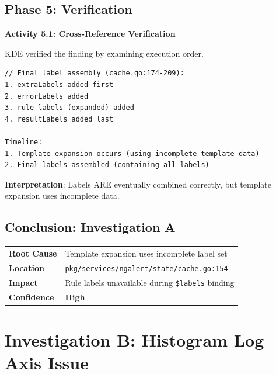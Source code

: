 \documentclass[
    11pt,
    a4paper,
    oneside,
    parskip=full,
    headings=big,
    bibliography=totoc
]{scrartcl}
\newcommand{\code}[1]{\texttt{#1}}
\begin{document}
\subsection*{Phase 5: Verification}

\begin{actionbox}
    \textbf{Activity 5.1: Cross-Reference Verification}
    
    KDE verified the finding by examining execution order.
    
    \vspace{0.3cm}
    \begin{evidencebox}
    \begin{verbatim}
// Final label assembly (cache.go:174-209):
1. extraLabels added first
2. errorLabels added
3. rule labels (expanded) added
4. resultLabels added last

Timeline:
1. Template expansion occurs (using incomplete template data)
2. Final labels assembled (containing all labels)
    \end{verbatim}
    \end{evidencebox}
    
    \vspace{0.3cm}
    \textbf{Interpretation}: Labels ARE eventually combined correctly, but 
    template expansion uses incomplete data.
\end{actionbox}

\subsection*{Conclusion: Investigation A}

\begingroup
\addtolength{\tabcolsep}{4pt}
\begin{tabular}{p{4cm}p{10cm}}
    \toprule
    \textbf{Root Cause} & Template expansion uses incomplete label set \\
    \textbf{Location} & \code{pkg/services/ngalert/state/cache.go:154} \\
    \textbf{Impact} & Rule labels unavailable during \code{\$labels} binding \\
    \textbf{Confidence} & \textbf{High} \\
    \bottomrule
\end{tabular}
\endgroup

\newpage
\section{Investigation B: Histogram Log Axis Issue}
\end{document}
